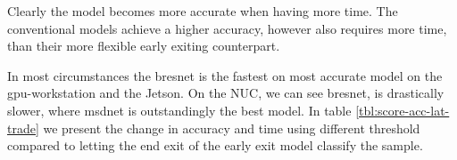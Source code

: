 Clearly the model becomes more accurate when having more time. The conventional models achieve a higher accuracy, however also requires more time, than their more flexible early exiting counterpart.

In most circumstances the \gls{bresnet} is the fastest on most accurate model on the \gls{gpu}-workstation and the Jetson. On the NUC, we can see \gls{bresnet}, is drastically slower, where \gls{msdnet} is outstandingly the best model. In table \ref{tbl:score-acc-lat-trade} we present the change in accuracy and time using different threshold compared to letting the end exit of the early exit model classify the sample.

\begin{minipage}[t]{\linewidth}\begin{small}
	

\end{small}
\end{minipage}
